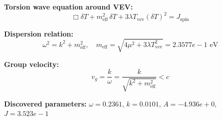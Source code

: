 
\textbf{Torsion wave equation around VEV:}
\begin{equation}
  \Box \delta T + m_{\text{eff}}^2 \, \delta T + 3\lambda T_{\text{vev}} (\delta T)^2 = J_{\text{spin}}
\end{equation}

\textbf{Dispersion relation:}
\begin{equation}
  \omega^2 = k^2 + m_{\text{eff}}^2, \quad
  m_{\text{eff}} = \sqrt{4\mu^2 + 3\lambda T_{\text{vev}}^2} = 2.3577e-1 \text{ eV}
\end{equation}

\textbf{Group velocity:}
\begin{equation}
  v_g = \frac{k}{\omega} = \frac{k}{\sqrt{k^2 + m_{\text{eff}}^2}} < c
\end{equation}

\textbf{Discovered parameters:}
$\omega = 0.2361$, \quad
$k = 0.0101$, \quad
$A = -4.936e+0$, \quad
$J = 3.523e-1$